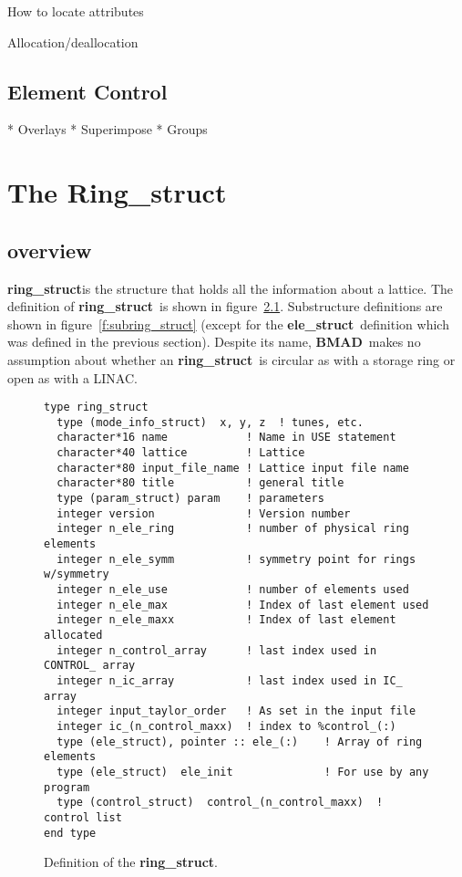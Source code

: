 \documentclass{book}
\newcommand{\ringstruct}{{\bf ring\_struct}}
\newcommand{\elestruct}{{\bf ele\_struct}}
\newcommand{\bmad}{{\bf BMAD}}
\begin{document}
  How to locate attributes

  Allocation/deallocation

\section{Element Control}

    * Overlays
    * Superimpose
    * Groups

\chapter{The Ring\_struct}

\section{overview}

\ringstruct is the structure that holds all the information about a lattice.
The definition of \ringstruct\ is shown in figure~\ref{f:ring_struct}.
Substructure definitions are shown in figure~\ref{f:subring_struct} (except for the
\elestruct\ definition which was defined in the previous section). Despite its
name, \bmad\ makes no assumption about whether an \ringstruct\ is circular as
with a storage ring or open as with a LINAC.

\begin{figure}[tb]
\centering
\begin{verbatim}
type ring_struct
  type (mode_info_struct)  x, y, z  ! tunes, etc.
  character*16 name            ! Name in USE statement
  character*40 lattice         ! Lattice
  character*80 input_file_name ! Lattice input file name
  character*80 title           ! general title
  type (param_struct) param    ! parameters
  integer version              ! Version number
  integer n_ele_ring           ! number of physical ring elements
  integer n_ele_symm           ! symmetry point for rings w/symmetry
  integer n_ele_use            ! number of elements used
  integer n_ele_max            ! Index of last element used
  integer n_ele_maxx           ! Index of last element allocated
  integer n_control_array      ! last index used in CONTROL_ array
  integer n_ic_array           ! last index used in IC_ array
  integer input_taylor_order   ! As set in the input file
  integer ic_(n_control_maxx)  ! index to %control_(:)
  type (ele_struct), pointer :: ele_(:)    ! Array of ring elements
  type (ele_struct)  ele_init              ! For use by any program
  type (control_struct)  control_(n_control_maxx)  ! control list
end type
\end{verbatim}
\caption{Definition of the \ringstruct.}
\label{f:ring_struct}
\end{figure}
\end{document}
